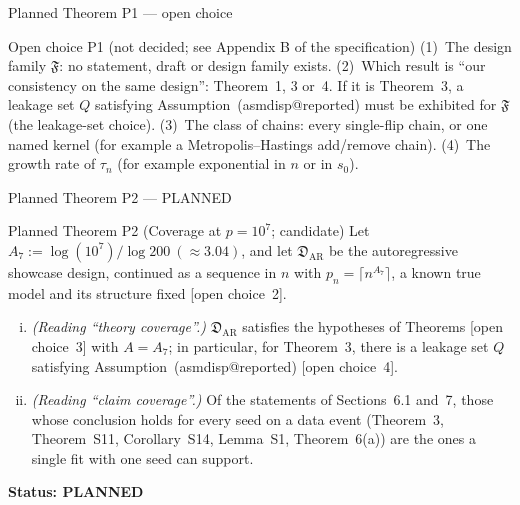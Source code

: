 \documentclass[aspectratio=169]{beamer}
\makeatletter
\newcommand{\asmdisp}[1]{\csname asmdisp@#1\endcsname}
\newcommand{\as}[1]{\textup{(\asmdisp{#1})}}
\newcommand{\sz}{s_0}
\makeatother
\begin{document}
\begin{frame}{Planned Theorem P1 --- open choice}
\small
\begin{block}{Open choice P1 (not decided; see Appendix B of the specification)}
(1)~The design family $\mathfrak F$: no statement, draft or design family exists. (2)~Which result is
``our consistency on the same design'': Theorem~1, 3 or~4. If it is
Theorem~3, a leakage set $Q$ satisfying Assumption~\as{reported} must be exhibited for $\mathfrak F$
(the leakage-set choice). (3)~The class of chains: every single-flip chain, or one named kernel (for example a
Metropolis--Hastings add/remove chain). (4)~The growth rate of $\tau_n$ (for example exponential in $n$ or in $\sz$).
\end{block}
\end{frame}

\begin{frame}{Planned Theorem P2 --- PLANNED}
\small
\begin{alertblock}{Planned Theorem P2 (Coverage at $p=10^7$; candidate)}
Let $A_7:=\log(10^7)/\log200\ (\approx3.04)$, and let $\mathfrak D_{\mathrm{AR}}$ be the autoregressive showcase design,
continued as a sequence in $n$ with $p_n=\lceil n^{A_7}\rceil$, a known true model and its structure fixed
\textup{[open choice~2]}.
\begin{enumerate}[(i)]
  \item \emph{(Reading ``theory coverage''.)} $\mathfrak D_{\mathrm{AR}}$ satisfies the hypotheses of Theorems
    \textup{[open choice~3]} with $A=A_7$; in particular, for Theorem~3, there is a leakage set $Q$
    satisfying Assumption~\as{reported} \textup{[open choice~4]}.
  \item \emph{(Reading ``claim coverage''.)} Of the statements of Sections~6.1 and~7, those
    whose conclusion holds for every seed on a data event (Theorem~3, Theorem~S11,
    Corollary~S14, Lemma~S1, Theorem~6(a)) are the ones a single fit with one
    seed can support.
\end{enumerate}
\end{alertblock}
\medskip\noindent\textbf{Status: PLANNED}
\end{frame}
\end{document}
